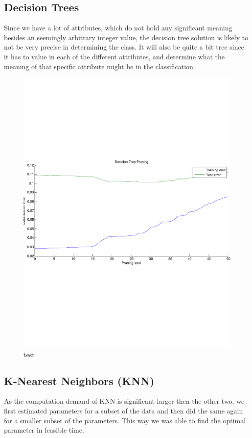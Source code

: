 \subsection{Decision Trees}
Since we have a lot of attributes, which do not hold any significant meaning besides an seemingly arbitrary integer value, the decision tree solution is likely to not be very precise in determining the class. It will also be quite a bit tree since it has to value in each  of the different attributes, and determine what the meaning of that specific attribute might be in the classification.
\begin{figure}[H]
\centering
\includegraphics[width=\linewidth]{code/decision_tree_pruning}
\caption{test\label{fig:linf}}
\end{figure}

\subsection{K-Nearest Neighbors (KNN)}
As the computation demand of KNN is significant larger then the other two, we first estimated parameters for a subset of the data and then did the same again for a smaller subset of the parameters. This way we was able to find the optimal parameter in feasible time.

